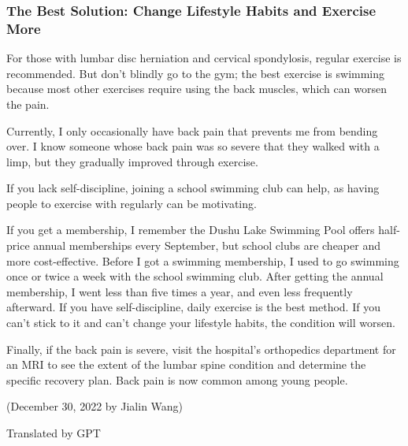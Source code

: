 \subsubsection{The Best Solution: Change Lifestyle Habits and Exercise More}

For those with lumbar disc herniation and cervical spondylosis, regular exercise is recommended. But don't blindly go to the gym; the best exercise is swimming because most other exercises require using the back muscles, which can worsen the pain.

Currently, I only occasionally have back pain that prevents me from bending over. I know someone whose back pain was so severe that they walked with a limp, but they gradually improved through exercise.

If you lack self-discipline, joining a school swimming club can help, as having people to exercise with regularly can be motivating.

If you get a membership, I remember the Dushu Lake Swimming Pool offers half-price annual memberships every September, but school clubs are cheaper and more cost-effective. Before I got a swimming membership, I used to go swimming once or twice a week with the school swimming club. After getting the annual membership, I went less than five times a year, and even less frequently afterward.
If you have self-discipline, daily exercise is the best method.
If you can't stick to it and can't change your lifestyle habits, the condition will worsen.

Finally, if the back pain is severe, visit the hospital's orthopedics department for an MRI to see the extent of the lumbar spine condition and determine the specific recovery plan. Back pain is now common among young people.

\begin{flushright}
(December 30, 2022 by Jialin Wang)

Translated by GPT
\end{flushright}
